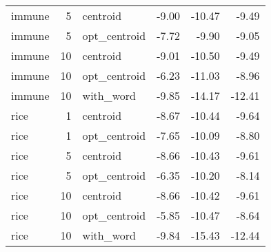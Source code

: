 \documentclass{article}
\begin{document}
\begin{table}[H]
\begin{tabular}{lrlrrr}
  immune &   5 & centroid & -9.00 & -10.47 & -9.49 \\ 
  immune &   5 & opt\_centroid & -7.72 & -9.90 & -9.05 \\ 
  immune &  10 & centroid & -9.01 & -10.50 & -9.49 \\ 
  immune &  10 & opt\_centroid & -6.23 & -11.03 & -8.96 \\ 
  immune &  10 & with\_word & -9.85 & -14.17 & -12.41 \\ 
  rice &   1 & centroid & -8.67 & -10.44 & -9.64 \\ 
  rice &   1 & opt\_centroid & -7.65 & -10.09 & -8.80 \\ 
  rice &   5 & centroid & -8.66 & -10.43 & -9.61 \\ 
  rice &   5 & opt\_centroid & -6.35 & -10.20 & -8.14 \\ 
  rice &  10 & centroid & -8.66 & -10.42 & -9.61 \\ 
  rice &  10 & opt\_centroid & -5.85 & -10.47 & -8.64 \\ 
  rice &  10 & with\_word & -9.84 & -15.43 & -12.44 \\ 
   \hline
\end{tabular}
\end{table}
\end{document}
